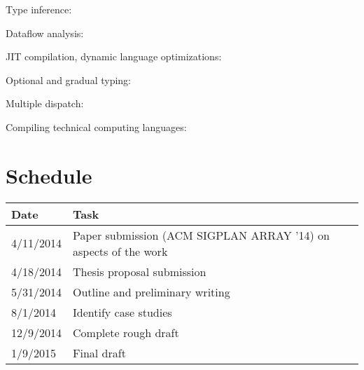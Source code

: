 \documentclass[12pt]{article}
\begin{document}
Type inference: \cite{kaplanullman, MLtypeinf, TICL,
pticl, nimble, taggingopt, typeinfjavascript}

Dataflow analysis: \cite{graphfree, abstractinterp, widening}

JIT compilation, dynamic language optimizations: \cite{futamura, pypyjit,
selflang, tracingjit, tracingjit2, druby,
profileguided, rubydust, lispcrit}

Optional and gradual typing: \cite{typedscheme, dylantypes, dyntype,
gradualobjects}

Multiple dispatch: \cite{closoverview, closspec, cecil, dieselspec, dylanlang}

Compiling technical computing languages: \cite{telescoping, telescopingvectorization,
slicehoisting, falcon, Rose:1999tt, Li:2013mf, matlabspecializer, majic}


\section{Schedule}


\begin{tabular}{|l|l|}
\hline
\textbf{Date} & \textbf{Task} \\
\hline \hline
4/11/2014 &  Paper submission (ACM SIGPLAN ARRAY '14) on aspects of the work \\
\hline
4/18/2014 & Thesis proposal submission \\
\hline
5/31/2014 & Outline and preliminary writing \\
\hline

8/1/2014 & Identify case studies \\

\hline
12/9/2014 & Complete rough draft \\
\hline
1/9/2015 & Final draft \\
\hline
\end{tabular}

\newpage



\end{document}
